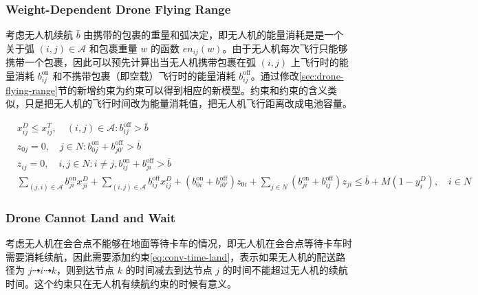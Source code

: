 \documentclass[fontset=none]{ctexart}
\begin{document}
\subsubsection{Weight-Dependent Drone Flying Range}
考虑无人机续航 $\bar{b}$ 由携带的包裹的重量和弧决定，即无人机的能量消耗是是一个关于弧 $(i, j) \in \mathcal{A}$ 和包裹重量 $w$ 的函数 $en_{ij}(w)$。由于无人机每次飞行只能够携带一个包裹，因此可以预先计算出当无人机携带包裹在弧 $(i, j)$ 上飞行时的能量消耗 $b_{ij}^{\text{on}}$ 和不携带包裹（即空载）飞行时的能量消耗 $b_{ij}^{\text{off}}$。通过修改\cref{sec:drone-flying-range}节的新增约束为约束可以得到相应的新模型。约束和约束的含义类似，只是把无人机的飞行时间改为能量消耗值，把无人机飞行距离改成电池容量。

\begin{corollary}
    \begin{align}
        & x_{ij}^D \leq x_{ij}^T, \quad (i, j) \in \mathcal{A}: b_{ij}^{\text{off}} > \bar{b} \tag{6a}\label{eq:conv-D-T-weight} \\
        & z_{0j} = 0, \quad j \in N: b_{0j}^{\text{on}} + b_{j0'}^{\text{off}} > \bar{b} \tag{6b}\label{eq:conv-z-weight} \\
        & z_{ij} = 0, \quad i,j \in N: i \neq j, b_{ij}^{\text{on}} + b_{ji}^{\text{off}} > \bar{b} \tag{6c}\label{eq:conv-z-weight-2} \\
        & \sum_{(j, i) \in \mathcal{A}}b_{ji}^{\text{on}} x_{ji}^D + \sum_{(i,j) \in \mathcal{A}}b_{ij}^{\text{off}} x_{ij}^D + \left(b_{0i}^{\text{on}} + b_{i0'}^{\text{off}}\right)z_{0i} + \sum_{j \in N}\left(b_{ji}^{\text{on}} + b_{ij}^{\text{off}}\right)z_{ji} \leq \bar{b} + M\left(1 - y_i^D\right), \quad i \in N \tag{6d}\label{eq:conv-time-weight}
    \end{align}
\end{corollary}

\subsubsection{Drone Cannot Land and Wait}
考虑无人机在会合点不能够在地面等待卡车的情况，即无人机在会合点等待卡车时需要消耗续航，因此需要添加约束\cref{eq:conv-time-land}，表示如果无人机的配送路径为 $j \dashrightarrow i \dashrightarrow k$，则到达节点 $k$ 的时间减去到达节点 $j$ 的时间不能超过无人机的续航时间。这个约束只在无人机有续航约束的时候有意义。 
\end{document}

